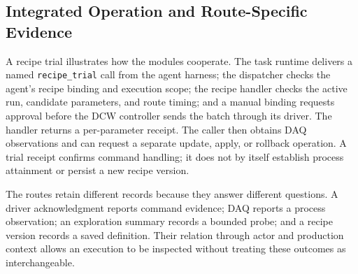 \subsection{Integrated Operation and Route-Specific Evidence}
\label{sec:tasklifecycle}
A recipe trial illustrates how the modules cooperate. The task runtime
delivers a named \texttt{recipe\_trial} call from the agent harness; the
dispatcher checks the agent's recipe binding and execution scope; the recipe
handler checks the active run, candidate parameters, and route timing; and a
manual binding requests approval before the DCW controller sends the batch
through its driver. The handler returns a per-parameter receipt. The caller
then obtains DAQ observations and can request a separate update, apply, or
rollback operation. A trial receipt confirms command handling; it does not
by itself establish process attainment or persist a new recipe version.

The routes retain different records because they answer different
questions. A driver acknowledgment reports command evidence; DAQ reports a
process observation; an exploration summary records a bounded probe; and a
recipe version records a saved definition. Their relation through actor and
production context allows an execution to be inspected without treating
these outcomes as interchangeable.


